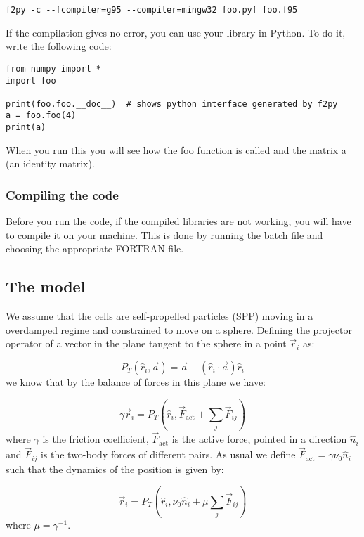 \documentclass[12pt]{article}
\begin{document}
\begin{verbatim}
f2py -c --fcompiler=g95 --compiler=mingw32 foo.pyf foo.f95
\end{verbatim}
If the compilation gives no error, you can use your library in Python. To do it, write the following code:


\begin{verbatim}
from numpy import * 
import foo 

print(foo.foo.__doc__)  # shows python interface generated by f2py
a = foo.foo(4)
print(a)
\end{verbatim}
When you run this you will see how the foo function is called and the matrix a (an identity matrix).

\subsubsection{Compiling the code}

Before you run the code, if the compiled libraries are not working, you will have to compile it on your machine. This is done by running the batch file  and choosing the appropriate FORTRAN file.

\subsection{The model}

We assume that the cells are self-propelled particles (SPP) moving in a overdamped regime and constrained to move on a sphere. Defining the projector operator of a vector in the plane tangent to the sphere in a point $\vec{r}_i$ as:

\begin{equation}
P_T \left(\hat{r}_i, \vec{a} \right) = \vec{a} - \left(\hat{r}_i \cdot \vec{a}\right)\hat{r}_i
\end{equation}
we know that by the balance of forces in this plane we have:

\begin{equation}
\gamma \dot{\vec{r}}_i = P_T \left(\hat{r}_i, \vec{F}_{\text{act}} + \sum_j \vec{F}_{ij} \right)
\end{equation}
where $\gamma$ is the friction coefficient, $\vec{F}_{\text{act}}$ is the active force, pointed in a direction $\hat{n}_i$ and $\vec{F}_{ij}$ is the two-body forces of different pairs. As usual we define $\vec{F}_{\text{act}} = \gamma \nu_0 \hat{n}_i$ such that the dynamics of the position is given by:

\begin{equation}
\dot{\vec{r}}_i = P_T \left(\hat{r}_i, \nu_0 \hat{n}_i + \mu \sum_j \vec{F}_{ij} \right)
\end{equation}
where $\mu=\gamma^{-1}$.
\end{document}

